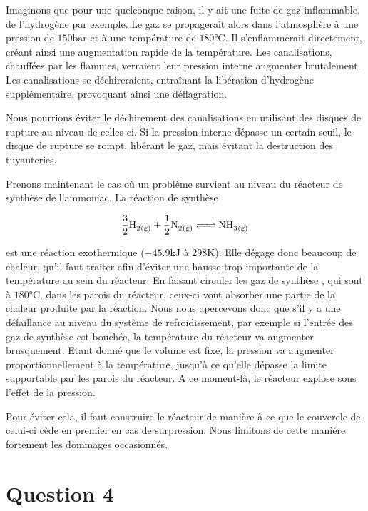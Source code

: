 \documentclass[a4paper,oneside,12pt]{article}
\begin{document}
Imaginons que pour une quelconque raison, il y ait une fuite de gaz inflammable, 
de l'hydrogène par exemple. Le gaz se propagerait alors dans l'atmosphère à 
une pression de $150\si{\bar}$ et à une température de $180\si{\celsius}$. 
Il s'enflammerait directement, créant ainsi une augmentation rapide de la température. 
Les canalisations, chauffées par les flammes, verraient leur pression interne augmenter 
brutalement. Les canalisations se déchireraient, entraînant la libération d'hydrogène 
supplémentaire, provoquant ainsi une déflagration.

Nous pourrions éviter le déchirement des canalisations en utilisant des disques de rupture 
au niveau de celles-ci. Si la pression interne dépasse un certain seuil, le disque de rupture 
se rompt, libérant le gaz, mais évitant la destruction des tuyauteries.

Prenons maintenant le cas où un problème survient au niveau du réacteur de synthèse 
de l'ammoniac. La réaction de synthèse

\begin{equation}
	\ce{\frac{3}{2} H2_{(g)} + \frac{1}{2} N2_{(g)} <=> NH3_{(g)}}
	\label{eq:synthesis}
\end{equation}

est une réaction exothermique ($-45.9\si{\kilo\joule}$ à $298\si{\kelvin}$). 
Elle dégage donc beaucoup de chaleur, qu'il faut traiter afin d'éviter 
une hausse trop importante de la température au sein du réacteur. 
En faisant circuler les gaz de synthèse ,  
qui sont à $180\si{\celsius}$, dans les parois du réacteur, 
ceux-ci vont absorber une partie de la chaleur produite par la réaction. 
Nous nous apercevons donc que s'il y a une défaillance au niveau du système 
de refroidissement, par exemple si l'entrée des gaz de synthèse est bouchée, 
la température du réacteur va augmenter brusquement. Etant donné que le volume est fixe, 
la pression va augmenter proportionnellement à la température, 
jusqu'à ce qu'elle dépasse la limite supportable par les parois du réacteur. 
A ce moment-là, le réacteur explose sous l'effet de la pression.

Pour éviter cela, il faut construire le réacteur de manière à ce que 
le couvercle de celui-ci cède en premier en cas de surpression. 
Nous limitons de cette manière fortement les dommages occasionnés.

\section*{Question 4}
\end{document}
